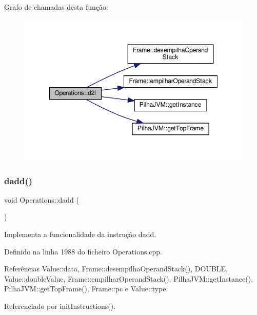 Grafo de chamadas desta função\+:\nopagebreak
\begin{figure}[H]
\begin{center}
\leavevmode
\includegraphics[width=348pt]{classOperations_a2babf3c9e2ac30a70a07f8d43b32440a_cgraph}
\end{center}
\end{figure}
\mbox{\label{classOperations_a8a23241bed8c033ab75994a18bf2a702}} 
\subsubsection{\texorpdfstring{dadd()}{dadd()}}
{\footnotesize\ttfamily void Operations\+::dadd (\begin{DoxyParamCaption}{ }\end{DoxyParamCaption})\hspace{0.3cm}{\ttfamily [private]}}



Implementa a funcionalidade da instrução dadd. 



Definido na linha 1988 do ficheiro Operations.\+cpp.



Referências Value\+::data, Frame\+::desempilha\+Operand\+Stack(), D\+O\+U\+B\+LE, Value\+::double\+Value, Frame\+::empilhar\+Operand\+Stack(), Pilha\+J\+V\+M\+::get\+Instance(), Pilha\+J\+V\+M\+::get\+Top\+Frame(), Frame\+::pc e Value\+::type.



Referenciado por init\+Instructions().


